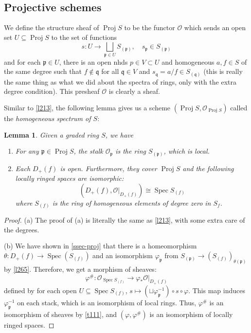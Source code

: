 \documentclass[12pt]{article}
\newtheorem{lemma}{Lemma}[subsection]
\theoremstyle{remark}
\newcommand{\Spec}[0]{\operatorname{Spec}}
\newcommand{\Proj}[0]{\operatorname{Proj}}
\begin{document}
	\subsection{Projective schemes}\label{ssec-proj-scheme}
	We define the structure sheaf of $\Proj S$ to be the functor $\mathscr O$ which sends an open set $U\subseteq\Proj S$ to the set of functions
	\[s:U\to \bigsqcup_{\mathfrak p\in U}S_{(\mathfrak p)},\quad s_{\mathfrak p}\in S_{(\mathfrak p)}\]
	and for each $\mathfrak p\in U$, there is an open nhds $p\in V\subset U$ and homogeneous $a, f\in S$ of the same degree such that $f\notin \mathfrak q$ for all $\mathfrak q\in V$ and $s_{\mathfrak q}=a/f\in S_{(\mathfrak q)}$ (this is really the same thing as what we did about the spectra of rings, only with the extra degree condition). This presheaf $\mathscr O$ is clearly a sheaf.
	
	Similar to \autoref{l213}, the following lemma gives us a scheme $(\Proj S, \mathscr O_{\Proj S})$ called the \textit{homogeneous spectrum of $S$}:
	\begin{lemma}\label{l271}
		Given a graded ring $S$, we have
		\begin{enumerate}[\normalfont(a)]
			\item For any $\mathfrak p\in\Proj S$, the stalk $\mathscr O_{\mathfrak p}$ is the ring $S_{(\mathfrak p)}$, which is local.
			\item Each $D_+(f)$ is open. Furthermore, they cover $\Proj S$ and the following locally ringed spaces are isomorphic:
				\[\left(D_+(f), \mathscr O|_{D_+(f)}\right)\cong\Spec S_{(f)}\]
			where $S_{(f)}$ is the ring of homogeneous elements of degree zero in $S_f$.
		\end{enumerate}
	\end{lemma}
	\begin{proof}
		(a) The proof of (a) is literally the same as \autoref{l213}, with some extra care of the degrees.

		(b) We have shown in \autoref{ssec-proj} that there is a homeomorphism $\theta:D_+(f)\to \Spec(S_{(f)})$ and an isomorphism $\varphi_{\mathfrak p}$ from $S_{(\mathfrak p)}\to (S_{(f)})_{\theta(\mathfrak p)}$ by \autoref{l265}. Therefore, we get a morphism of sheaves:
		\[\varphi^\#:\mathscr{O}_{\Spec S_{(f)}}\to \varphi_*\mathscr O|_{D_+(f)}\]
		defined by for each open $U\subseteq \Spec S_{(f)}$, $s\mapsto (\sqcup \varphi_{\mathfrak p}^{-1})\circ s\circ\varphi$. This map induces $\varphi_{\mathfrak p}^{-1}$ on each stack, which is an isomorphism of local rings. Thus, $\varphi^\#$ is an isomorphism of sheaves by \autoref{t111}, and $(\varphi,\varphi^\#)$ is an isomorphism of locally ringed spaces.
	\end{proof}
\end{document}
